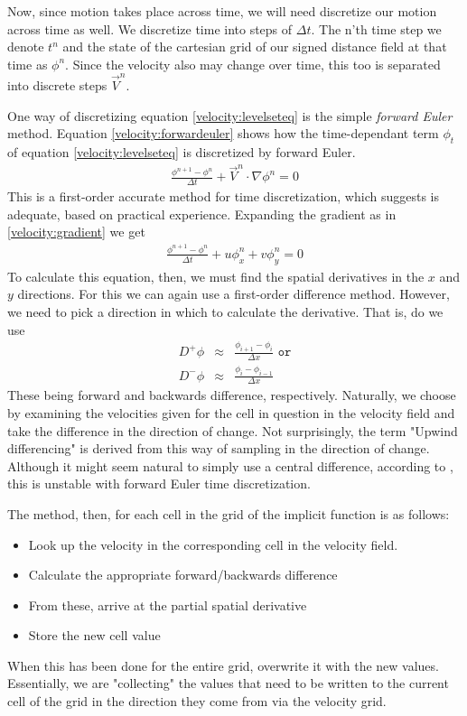 Now, since motion takes place across time, we will need discretize our
motion across time as well. We discretize time into steps of $\Delta
t$. The n'th time step we denote $t^n$ and the state of the cartesian
grid of our signed distance field at that time as $\phi^n$. Since the
velocity also may change over time, this too is separated into
discrete steps $\vec{V}^n$.

One way of discretizing equation \ref{velocity:levelseteq} is the
simple \emph{forward Euler} method. Equation
\vref{velocity:forwardeuler} shows how the time-dependant term
$\phi_t$ of equation \ref{velocity:levelseteq} is discretized by
forward Euler.
\begin{eqnarray}
\label{velocity:forwardeuler}
\frac{\phi^{n+1}-\phi^n}{\Delta t}+\vec{V}^n\cdot\nabla\phi^n = 0
\end{eqnarray}
This is a first-order accurate method for time discretization, which
 suggests is adequate, based on practical
experience.  Expanding the gradient as in \vref{velocity:gradient} we
get
\begin{eqnarray}
\label{velocity:forwardeuler}
\frac{\phi^{n+1}-\phi^n}{\Delta t}+u\phi_{x}^n + v\phi_{y}^n = 0
\end{eqnarray}
To calculate this equation, then, we must find the spatial derivatives
in the $x$ and $y$ directions. For this we can again use a first-order
difference method. However, we need to pick a direction in which to
calculate the derivative. That is, do we use
\begin{eqnarray}
D^+\phi &\approx & \frac{\phi_{i+1} - \phi_i}{\Delta x} \texttt{ or}\\
D^-\phi &\approx & \frac{\phi_i - \phi_{i-1}}{\Delta x}
\end{eqnarray}
These being forward and backwards difference, respectively. Naturally,
we choose by examining the velocities given for the cell in question
in the velocity field and take the difference in the direction of
change. Not surprisingly, the term "Upwind differencing" is derived
from this way of sampling in the direction of change.  Although it
might seem natural to simply use a central difference, according to
, this is unstable with forward Euler time
discretization.

The method, then, for each cell in the grid of the implicit function
is as follows:
\begin{itemize}
\item Look up the velocity in the corresponding cell in the velocity
  field.
\item Calculate the appropriate forward/backwards difference
\item From these, arrive at the partial spatial derivative
\item Store the new cell value
\end{itemize}
When this has been done for the entire grid, overwrite it with the new
values.  Essentially, we are "collecting" the values that need to be
written to the current cell of the grid in the direction they come
from via the velocity grid.

